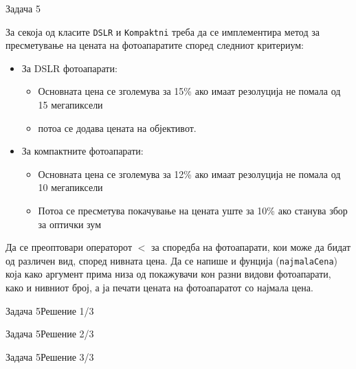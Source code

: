 \begin{frame}{Задача 5}
\begin{scriptsize}
За секоја од класите \texttt{DSLR} и \texttt{Kompaktni} треба да се имплементира
метод за пресметување на цената на фотоапаратите според следниот критериум: 
\begin{itemize}
  \item За DSLR фотоапарати:
  \begin{itemize}
  \item Основната цена се зголемува за 15\% ако имаат резолуција не помала од 15
  мегапиксели
  \item потоа се додава цената на објективот.
  \end{itemize}
  \item За компактните фотоапарати: 
  \begin{itemize}
    \item Основната цена се зголемува за 12\% ако имаат резолуција не помала од
    10 мегапиксели
    \item Потоа се пресметува покачување на цената уште за 10\% ако станува збор
    за оптички зум
  \end{itemize}  
\end{itemize}
Да се преоптовари операторот $<$ за споредба на фотоапарати, кои може да бидат
од различен вид, според нивната цена.
Да се напише и фунција (\texttt{najmalaCena}) која како аргумент прима низа од
покажувачи кон разни видови фотоапарати, како и нивниот број, а ја печати цената
на фотоапаратот со најмала цена.
\end{scriptsize}
\end{frame}

\begin{frame}[fragile]{Задача 5}{Решение 1/3}

\end{frame}

\begin{frame}[fragile]{Задача 5}{Решение 2/3}

\end{frame}

\begin{frame}[fragile]{Задача 5}{Решение 3/3}

\end{frame}


